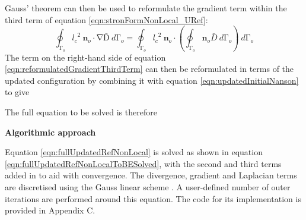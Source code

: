 \documentclass[sn-mathphys,Numbered,draft]{sn-jnl}%
\begin{document}
\begin{appendices}
Gauss' theorem can then be used to reformulate the gradient term within the third term of equation \ref{eqn:stronFormNonLocal_URef}:
\begin{equation}
\label{eqn:reformulatedGradientThirdTerm}
\oint_{\mathrm{\Gamma}_o}{{l_c}^2\ \mathbf{n}_o\cdot\mathrm{\nabla}\mathrm{\bar{D}}}\ d\mathrm{\Gamma}_o=\oint_{\mathrm{\Gamma}_o}{{l_c}^2\ \mathbf{n}_o\cdot\left(\oint_{\mathrm{\Gamma}_o}\mathbf{n}_o\bar{D}\ d\mathrm{\Gamma}_o\right)}\ d\mathrm{\Gamma}_o
\end{equation}
The term on the right-hand side of equation \ref{eqn:reformulatedGradientThirdTerm} can then be reformulated in terms of the updated configuration by combining it with equation \ref{eqn:updatedInitialNanson} to give

The full equation to be solved is therefore 

\textbf{Algorithmic approach}

Equation \ref{eqn:fullUpdatedRefNonLocal} is solved as shown in equation \ref{eqn:fullUpdatedRefNonLocalToBESolved}, with the second and third terms added in to aid with convergence. The divergence, gradient and Laplacian terms are discretised using the Gauss linear scheme \cite{noauthor_openfoam_2015}. A user-defined number of outer iterations are performed around this equation. The code for its implementation is provided in Appendix C.


\end{appendices}
\end{document}
